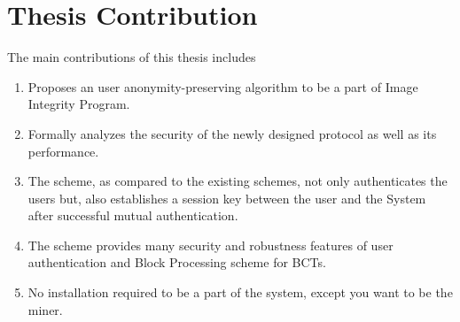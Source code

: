 \section{Thesis Contribution}
The main contributions of this thesis includes
\begin{enumerate}
\item Proposes an user anonymity-preserving algorithm to be a part of Image Integrity Program.
\item Formally analyzes the security of the newly designed protocol as well as its performance.
\item The scheme, as compared to the existing schemes, not only authenticates the users but, also establishes a session key between the user and the System after successful mutual authentication.
\item The scheme provides many security and robustness features of user authentication and Block Processing scheme for BCTs.
\item No installation required to be a part of the system, except you want to be the miner.
\end{enumerate}
